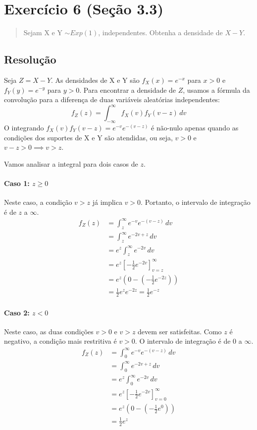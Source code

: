 \documentclass[12pt]{article}
\begin{document}
\pagebreak

\section{Exercício 6 (Seção 3.3)}

\begin{quote}
Sejam X e Y $\sim Exp(1)$, independentes. Obtenha a densidade de $X-Y$.
\end{quote}

\subsection*{Resolução}
Seja $Z = X-Y$. As densidades de X e Y são $f_X(x) = e^{-x}$ para $x>0$ e $f_Y(y) = e^{-y}$ para $y>0$. Para encontrar a densidade de $Z$, usamos a fórmula da convolução para a diferença de duas variáveis aleatórias independentes:
\[ f_Z(z) = \int_{-\infty}^{\infty} f_X(v) f_Y(v-z) \,dv \]
O integrando $f_X(v)f_Y(v-z) = e^{-v}e^{-(v-z)}$ é não-nulo apenas quando as condições dos suportes de X e Y são atendidas, ou seja, $v > 0$ e $v-z > 0 \implies v > z$.

Vamos analisar a integral para dois casos de $z$.

\paragraph{Caso 1: $z \ge 0$}
Neste caso, a condição $v>z$ já implica $v>0$. Portanto, o intervalo de integração é de $z$ a $\infty$.
\begin{align*}
f_Z(z) &= \int_{z}^{\infty} e^{-v} e^{-(v-z)} \,dv \\
&= \int_{z}^{\infty} e^{-2v+z} \,dv \\
&= e^z \int_{z}^{\infty} e^{-2v} \,dv \\
&= e^z \left[ -\frac{1}{2}e^{-2v} \right]_{v=z}^{\infty} \\
&= e^z \left( 0 - \left(-\frac{1}{2}e^{-2z}\right) \right) \\
&= \frac{1}{2} e^{z} e^{-2z} = \frac{1}{2} e^{-z}
\end{align*}

\paragraph{Caso 2: $z < 0$}
Neste caso, as duas condições $v>0$ e $v>z$ devem ser satisfeitas. Como $z$ é negativo, a condição mais restritiva é $v>0$. O intervalo de integração é de $0$ a $\infty$.
\begin{align*}
f_Z(z) &= \int_{0}^{\infty} e^{-v} e^{-(v-z)} \,dv \\
&= \int_{0}^{\infty} e^{-2v+z} \,dv \\
&= e^z \int_{0}^{\infty} e^{-2v} \,dv \\
&= e^z \left[ -\frac{1}{2}e^{-2v} \right]_{v=0}^{\infty} \\
&= e^z \left( 0 - \left(-\frac{1}{2}e^{0}\right) \right) \\
&= \frac{1}{2} e^z
\end{align*}
\end{document}
